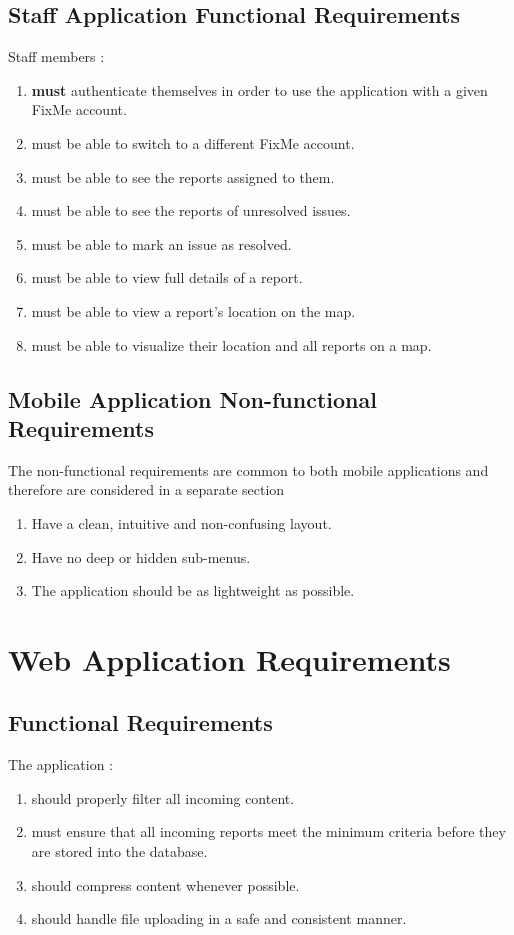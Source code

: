 \documentclass[12pt]{ecsproject}     %
\begin{document}
\subsection{Staff Application Functional Requirements}
Staff members : 
\begin{enumerate}
\item \textbf{must} authenticate themselves in order to use the application with a given FixMe account.
\item must be able to switch to a different FixMe account.
\item must be able to see the reports assigned to them.
\item must be able to see the reports of unresolved issues.
\item must be able to mark an issue as resolved.
\item must be able to view full details of a report.
\item must be able to view a report's location on the map.
\item must be able to visualize their location and all reports on a map.
\end{enumerate}

\subsection{Mobile Application Non-functional Requirements}
The non-functional requirements are common to both mobile applications and therefore are considered in a separate section
\begin{enumerate}
\item Have a clean, intuitive and non-confusing layout.
\item Have no deep or hidden sub-menus.
\item The application should be as lightweight as possible.
\end{enumerate}

\section{Web Application Requirements}
\subsection{Functional Requirements}
The application : 
\begin{enumerate}
\item should properly filter all incoming content.
\item must ensure that all incoming reports meet the minimum criteria before they are stored into the database.
\item should compress content whenever possible.
\item should handle file uploading in a safe and consistent manner.
\end{enumerate}
\end{document}
